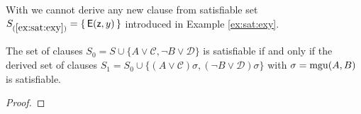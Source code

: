 \begin{example}
	With \InstGen we cannot derive any new clause from satisfiable set 
	$S_{(\ref{ex:sat:exy})  } = \{\,{\mathsf{E}}({\mathsf z},y)\,\}$ 
	introduced in Example \ref{ex:sat:exy}.
\end{example}

\begin{lemma}
	The set of clauses 
	$S_0 = S \cup
	\{ 
		 A\lor\mathcal C, \lnot B\lor\mathcal D
	\}$ 
	is satisfiable if and only if
	the derived set of clauses 
	$S_1 = S_0 \cup \{ (A\lor\mathcal C)\sigma, (\lnot B\lor\mathcal D)\sigma\}$
	with $\sigma = \operatorname{mgu}(A,B)$ 
	is satisfiable.
\end{lemma}

\begin{proof}
	
\end{proof}

